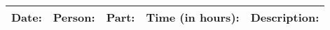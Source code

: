 \begin{table}[h]
    \begin{tabular}{|p{2cm}|p{2cm}|p{2.5cm}|p{1.5cm}|p{7.5cm}|}
        \hline
        Date:      & Person:       & Part:             & Time (in hours): & Description:                                       \\ \hline
    \end{tabular}
\end{table}
